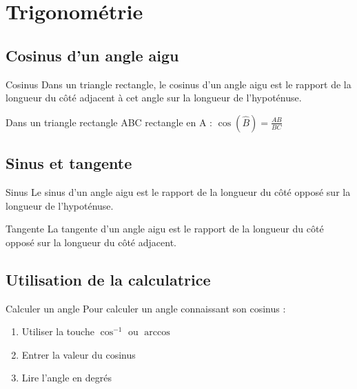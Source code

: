 \chapter{Trigonométrie}

\section{Cosinus d'un angle aigu}
\begin{definition}{Cosinus}
Dans un triangle rectangle, le cosinus d'un angle aigu est le rapport de la longueur du côté adjacent à cet angle sur la longueur de l'hypoténuse.
\end{definition}

\begin{exemple}
Dans un triangle rectangle ABC rectangle en A :
$\cos(\widehat{B}) = \frac{AB}{BC}$
\end{exemple}

\section{Sinus et tangente}
\begin{definition}{Sinus}
Le sinus d'un angle aigu est le rapport de la longueur du côté opposé sur la longueur de l'hypoténuse.
\end{definition}

\begin{definition}{Tangente}
La tangente d'un angle aigu est le rapport de la longueur du côté opposé sur la longueur du côté adjacent.
\end{definition}

\section{Utilisation de la calculatrice}
\begin{methode}{Calculer un angle}
Pour calculer un angle connaissant son cosinus :
\begin{enumerate}
    \item Utiliser la touche $\cos^{-1}$ ou $\arccos$
    \item Entrer la valeur du cosinus
    \item Lire l'angle en degrés
\end{enumerate}
\end{methode} 